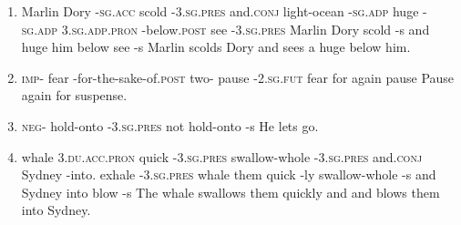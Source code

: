 \begin{enumerate}
\item
{}
{Marlin Dory -\textsc{sg.acc} scold -\textsc{3.sg.pres} and.\textsc{conj} light-ocean -\textsc{sg.adp} huge -\textsc{sg.adp} \textsc{3.sg.adp.pron} -below.\textsc{post} see -\textsc{3.sg.pres}}
{Marlin Dory {} scold -s and  {} huge {} him below see -s}
{Marlin scolds Dory and sees a huge  below him.}

\item
{}
{\textsc{imp}- fear -for-the-sake-of.\textsc{post} two- pause -\textsc{2.sg.fut}}
{{} fear for again pause {}}
{Pause again for suspense.}

\item
{}
{\textsc{neg}- hold-onto -\textsc{3.sg.pres}}
{not hold-onto -s}
{He lets go.}

\item
{}
{whale \textsc{3.du.acc.pron} quick -\textsc{3.sg.pres} swallow-whole -\textsc{3.sg.pres} and.\textsc{conj} Sydney -into. exhale -\textsc{3.sg.pres}}
{whale them quick -ly swallow-whole -s and Sydney into blow -s}
{The whale swallows them quickly and and blows them into Sydney.}

\end{enumerate}
